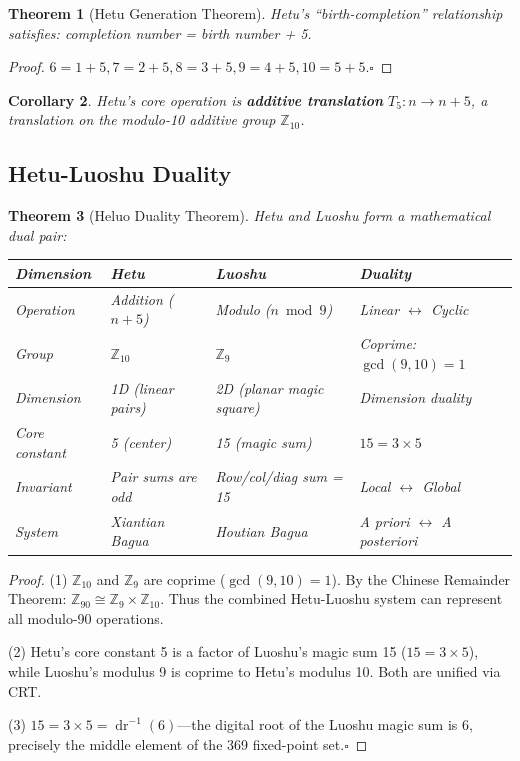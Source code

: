 \documentclass[conference]{IEEEtran}
\newtheorem{theorem}{Theorem}[section]
\newtheorem{corollary}[theorem]{Corollary}
\theoremstyle{remark}
\newcommand{\Z}{\mathbb{Z}}
\newcommand{\dr}{\operatorname{dr}}
\begin{document}
\begin{theorem}[Hetu Generation Theorem]
Hetu's ``birth-completion'' relationship satisfies: completion number = birth number + 5.
\end{theorem}
\begin{proof}
$6=1+5, 7=2+5, 8=3+5, 9=4+5, 10=5+5$.\hfill$\square$
\end{proof}

\begin{corollary}
Hetu's core operation is \textbf{additive translation} $T_5: n \to n+5$, a translation on the modulo-10 additive group $\Z_{10}$.
\end{corollary}

\subsection{Hetu-Luoshu Duality}

\begin{theorem}[Heluo Duality Theorem]
Hetu and Luoshu form a mathematical dual pair:

\vspace{4pt}
\begin{tabular}{p{2cm}p{2cm}p{2cm}p{2cm}}
\toprule
Dimension & Hetu & Luoshu & Duality \\
\midrule
Operation & Addition ($n+5$) & Modulo ($n\bmod 9$) & Linear $\leftrightarrow$ Cyclic \\
Group & $\Z_{10}$ & $\Z_9$ & Coprime: $\gcd(9,10)=1$ \\
Dimension & 1D (linear pairs) & 2D (planar magic square) & Dimension duality \\
Core constant & 5 (center) & 15 (magic sum) & $15 = 3\times 5$ \\
Invariant & Pair sums are odd & Row/col/diag sum = 15 & Local $\leftrightarrow$ Global \\
System & Xiantian Bagua & Houtian Bagua & A priori $\leftrightarrow$ A posteriori \\
\bottomrule
\end{tabular}
\end{theorem}

\begin{proof}
(1) $\Z_{10}$ and $\Z_9$ are coprime ($\gcd(9,10)=1$). By the Chinese Remainder Theorem: $\Z_{90} \cong \Z_9 \times \Z_{10}$. Thus the combined Hetu-Luoshu system can represent all modulo-90 operations.

(2) Hetu's core constant 5 is a factor of Luoshu's magic sum 15 ($15=3\times 5$), while Luoshu's modulus 9 is coprime to Hetu's modulus 10. Both are unified via CRT.

(3) $15 = 3\times 5 = \dr^{-1}(6)$---the digital root of the Luoshu magic sum is 6, precisely the middle element of the 369 fixed-point set.\hfill$\square$
\end{proof}
\end{document}
